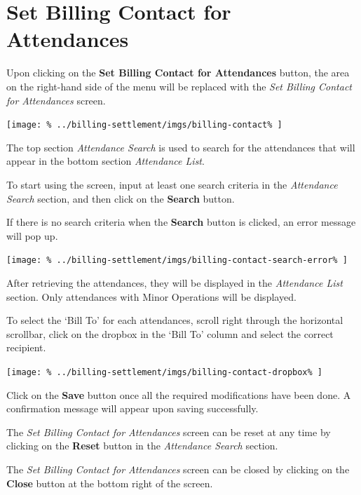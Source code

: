 \documentclass[../main/main]{subfiles}
\begin{document}
\newpage
\section{Set Billing Contact for Attendances}
\label{sec:set-billing-contact-for-attendances}

Upon clicking on the \textbf{Set Billing Contact for Attendances} button,
the area on the right-hand side of the menu will be replaced with the
\emph{Set Billing Contact for Attendances} screen.

\texttt{[image: \%
  ../billing-settlement/imgs/billing-contact\%
]}

The top section \emph{Attendance Search} is used to search for the
attendances that will appear in the bottom section \emph{Attendance List}.

To start using the screen, input at least one search criteria in the
\emph{Attendance Search} section, and then click on the \textbf{Search} button.

If there is no search criteria when the \textbf{Search} button is clicked,
an error message will pop up.

\texttt{[image: \%
  ../billing-settlement/imgs/billing-contact-search-error\%
]}

After retrieving the attendances, they will be displayed in the
\emph{Attendance List} section.
Only attendances with Minor Operations will be displayed.

To select the `Bill To' for each attendances, scroll right through the
horizontal scrollbar, click on the dropbox in the `Bill To' column and
select the correct recipient.

\texttt{[image: \%
  ../billing-settlement/imgs/billing-contact-dropbox\%
]}

Click on the \textbf{Save} button once all the required modifications have
been done. A confirmation message will appear upon saving successfully.

The \emph{Set Billing Contact for Attendances} screen can be reset at any time
by clicking on the \textbf{Reset} button in the \emph{Attendance Search}
section.

The \emph{Set Billing Contact for Attendances} screen can be closed by clicking
on the \textbf{Close} button at the bottom right of the screen.
\end{document}
